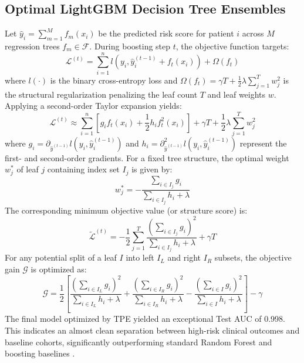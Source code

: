 \documentclass[11pt]{article}
\begin{document}
\subsection{Optimal LightGBM Decision Tree Ensembles}
Let $\hat{y}_i = \sum_{m=1}^M f_m(x_i)$ be the predicted risk score for patient $i$ across $M$ regression trees $f_m \in \mathcal{F}$. During boosting step $t$, the objective function targets:
\begin{equation}
\mathcal{L}^{(t)} = \sum_{i=1}^n l\left(y_i, \hat{y}_i^{(t-1)} + f_t(x_i)\right) + \Omega(f_t)
\end{equation}
where $l(\cdot)$ is the binary cross-entropy loss and $\Omega(f_t) = \gamma T + \frac{1}{2} \lambda \sum_{j=1}^T w_j^2$ is the structural regularization penalizing the leaf count $T$ and leaf weights $w$. Applying a second-order Taylor expansion yields:
\begin{equation}
\mathcal{L}^{(t)} \approx \sum_{i=1}^n \left[ g_i f_t(x_i) + \frac{1}{2} h_i f_t^2(x_i) \right] + \gamma T + \frac{1}{2} \lambda \sum_{j=1}^T w_j^2
\end{equation}
where $g_i = \partial_{\hat{y}^{(t-1)}} l(y_i, \hat{y}_i^{(t-1)})$ and $h_i = \partial^2_{\hat{y}^{(t-1)}} l(y_i, \hat{y}_i^{(t-1)})$ represent the first- and second-order gradients. For a fixed tree structure, the optimal weight $w_j^*$ of leaf $j$ containing index set $I_j$ is given by:
\begin{equation}
w_j^* = - \frac{\sum_{i \in I_j} g_i}{\sum_{i \in I_j} h_i + \lambda}
\end{equation}
The corresponding minimum objective value (or structure score) is:
\begin{equation}
\tilde{\mathcal{L}}^{(t)} = -\frac{1}{2} \sum_{j=1}^T \frac{\left( \sum_{i \in I_j} g_i \right)^2}{\sum_{i \in I_j} h_i + \lambda} + \gamma T
\end{equation}
For any potential split of a leaf $I$ into left $I_L$ and right $I_R$ subsets, the objective gain $\mathcal{G}$ is optimized as:
\begin{equation}
\mathcal{G} = \frac{1}{2} \left[ \frac{\left( \sum_{i \in I_L} g_i \right)^2}{\sum_{i \in I_L} h_i + \lambda} + \frac{\left( \sum_{i \in I_R} g_i \right)^2}{\sum_{i \in I_R} h_i + \lambda} - \frac{\left( \sum_{i \in I} g_i \right)^2}{\sum_{i \in I} h_i + \lambda} \right] - \gamma
\end{equation}
The final model optimized by TPE yielded an exceptional Test AUC of 0.998. This indicates an almost clean separation between high-risk clinical outcomes and baseline cohorts, significantly outperforming standard Random Forest and boosting baselines \citep{breiman2001random}.
\end{document}
